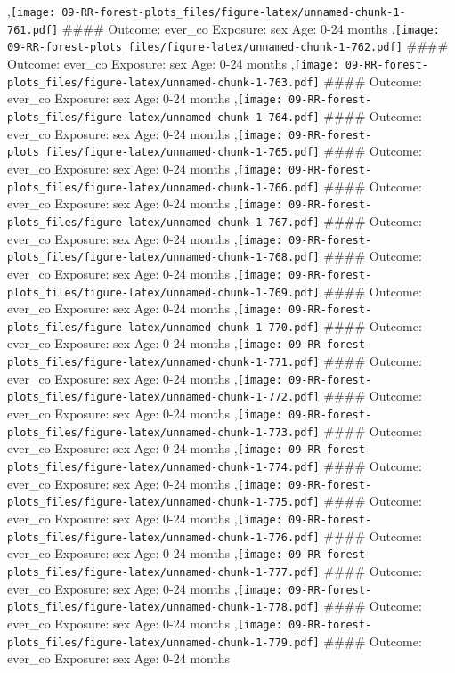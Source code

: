 \documentclass[
  9pt,
]{book}
\begin{document}
,\texttt{[image: 09-RR-forest-plots\_files/figure-latex/unnamed-chunk-1-761.pdf]}
\#\#\#\# Outcome: ever\_co Exposure: sex Age: 0-24 months
,\texttt{[image: 09-RR-forest-plots\_files/figure-latex/unnamed-chunk-1-762.pdf]}
\#\#\#\# Outcome: ever\_co Exposure: sex Age: 0-24 months
,\texttt{[image: 09-RR-forest-plots\_files/figure-latex/unnamed-chunk-1-763.pdf]}
\#\#\#\# Outcome: ever\_co Exposure: sex Age: 0-24 months
,\texttt{[image: 09-RR-forest-plots\_files/figure-latex/unnamed-chunk-1-764.pdf]}
\#\#\#\# Outcome: ever\_co Exposure: sex Age: 0-24 months
,\texttt{[image: 09-RR-forest-plots\_files/figure-latex/unnamed-chunk-1-765.pdf]}
\#\#\#\# Outcome: ever\_co Exposure: sex Age: 0-24 months
,\texttt{[image: 09-RR-forest-plots\_files/figure-latex/unnamed-chunk-1-766.pdf]}
\#\#\#\# Outcome: ever\_co Exposure: sex Age: 0-24 months
,\texttt{[image: 09-RR-forest-plots\_files/figure-latex/unnamed-chunk-1-767.pdf]}
\#\#\#\# Outcome: ever\_co Exposure: sex Age: 0-24 months
,\texttt{[image: 09-RR-forest-plots\_files/figure-latex/unnamed-chunk-1-768.pdf]}
\#\#\#\# Outcome: ever\_co Exposure: sex Age: 0-24 months
,\texttt{[image: 09-RR-forest-plots\_files/figure-latex/unnamed-chunk-1-769.pdf]}
\#\#\#\# Outcome: ever\_co Exposure: sex Age: 0-24 months
,\texttt{[image: 09-RR-forest-plots\_files/figure-latex/unnamed-chunk-1-770.pdf]}
\#\#\#\# Outcome: ever\_co Exposure: sex Age: 0-24 months
,\texttt{[image: 09-RR-forest-plots\_files/figure-latex/unnamed-chunk-1-771.pdf]}
\#\#\#\# Outcome: ever\_co Exposure: sex Age: 0-24 months
,\texttt{[image: 09-RR-forest-plots\_files/figure-latex/unnamed-chunk-1-772.pdf]}
\#\#\#\# Outcome: ever\_co Exposure: sex Age: 0-24 months
,\texttt{[image: 09-RR-forest-plots\_files/figure-latex/unnamed-chunk-1-773.pdf]}
\#\#\#\# Outcome: ever\_co Exposure: sex Age: 0-24 months
,\texttt{[image: 09-RR-forest-plots\_files/figure-latex/unnamed-chunk-1-774.pdf]}
\#\#\#\# Outcome: ever\_co Exposure: sex Age: 0-24 months
,\texttt{[image: 09-RR-forest-plots\_files/figure-latex/unnamed-chunk-1-775.pdf]}
\#\#\#\# Outcome: ever\_co Exposure: sex Age: 0-24 months
,\texttt{[image: 09-RR-forest-plots\_files/figure-latex/unnamed-chunk-1-776.pdf]}
\#\#\#\# Outcome: ever\_co Exposure: sex Age: 0-24 months
,\texttt{[image: 09-RR-forest-plots\_files/figure-latex/unnamed-chunk-1-777.pdf]}
\#\#\#\# Outcome: ever\_co Exposure: sex Age: 0-24 months
,\texttt{[image: 09-RR-forest-plots\_files/figure-latex/unnamed-chunk-1-778.pdf]}
\#\#\#\# Outcome: ever\_co Exposure: sex Age: 0-24 months
,\texttt{[image: 09-RR-forest-plots\_files/figure-latex/unnamed-chunk-1-779.pdf]}
\#\#\#\# Outcome: ever\_co Exposure: sex Age: 0-24 months
\end{document}
